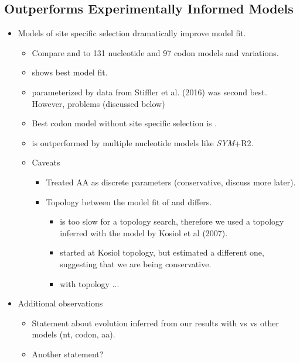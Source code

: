 \documentclass[12pt]{article}
\begin{document}
\subsection*{\selac Outperforms Experimentally Informed Models}
\begin{itemize}
	\item Models of site specific selection dramatically improve model fit.
	\begin{itemize}
		\item Compare \selac and \phydms to 131 nucleotide and 97 codon models and variations.
		\item \selac shows best model fit.
		\item \phydms parameterized by data from Stiffler et al. (2016) was second best.
		However, problems (discussed below)
		\item Best codon model without site specific selection is \gy.
		\item \gy is outperformed by multiple nucleotide models like \emph{SYM}+R2.
		\item Caveats
		\begin{itemize}
			\item Treated AA as discrete parameters (conservative, discuss more later).
			\item Topology between the model fit of \phydms and \selac differs.
			\begin{itemize}
				\item \selac is too slow for a topology search, therefore we used a topology inferred with the model by Kosiol et al (2007).
				\item \phydms started at Kosiol topology, but estimated a different one, suggesting that we are being conservative.
				\item \selac with \phydms topology ...        
			\end{itemize}
		\end{itemize}
	\end{itemize}
	\item Additional observations
	\begin{itemize}
		\item Statement about evolution inferred from our results with \selac vs \phydms vs other models (nt, codon, aa).
		\item Another statement?
	\end{itemize}
\end{itemize}
\end{document}
